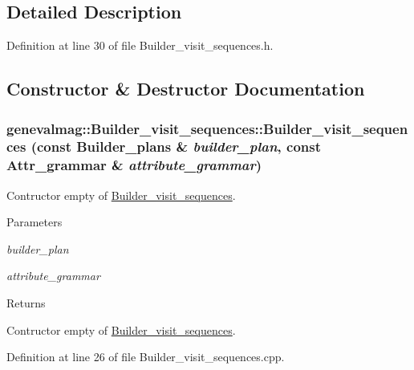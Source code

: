 \subsection{Detailed Description}


Definition at line 30 of file Builder\_\-visit\_\-sequences.h.



\subsection{Constructor \& Destructor Documentation}
\hypertarget{classgenevalmag_1_1Builder__visit__sequences_a14404a9245e81db0b848226b33c4705c}{
\subsubsection[{Builder\_\-visit\_\-sequences}]{\setlength{\rightskip}{0pt plus 5cm}genevalmag::Builder\_\-visit\_\-sequences::Builder\_\-visit\_\-sequences (const {\bf Builder\_\-plans} \& {\em builder\_\-plan}, \/  const {\bf Attr\_\-grammar} \& {\em attribute\_\-grammar})}}
\label{classgenevalmag_1_1Builder__visit__sequences_a14404a9245e81db0b848226b33c4705c}
Contructor empty of \hyperlink{classgenevalmag_1_1Builder__visit__sequences}{Builder\_\-visit\_\-sequences}. 
\begin{DoxyParams}{Parameters}
\item[{\em builder\_\-plan}]\item[{\em attribute\_\-grammar}]\end{DoxyParams}
\begin{DoxyReturn}{Returns}

\end{DoxyReturn}
Contructor empty of \hyperlink{classgenevalmag_1_1Builder__visit__sequences}{Builder\_\-visit\_\-sequences}. 

Definition at line 26 of file Builder\_\-visit\_\-sequences.cpp.

